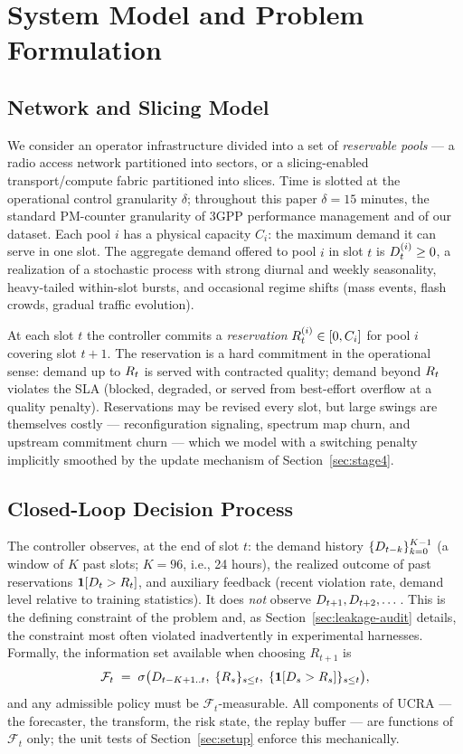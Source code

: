 \section{System Model and Problem Formulation}
\label{sec:system}

\subsection{Network and Slicing Model}

We consider an operator infrastructure divided into a set of
\emph{reservable pools} --- a radio access network partitioned into
sectors, or a slicing-enabled transport/compute fabric partitioned
into slices. Time is slotted at the operational control granularity
$\delta$; throughout this paper $\delta = 15$ minutes, the standard
PM-counter granularity of 3GPP performance management and of our
dataset. Each pool $i$ has a physical capacity $C_i$: the maximum
demand it can serve in one slot. The aggregate demand offered to pool
$i$ in slot $t$ is $D_t^{(i)} \ge 0$, a realization of a stochastic
process with strong diurnal and weekly seasonality, heavy-tailed
within-slot bursts, and occasional regime shifts
(mass events, flash crowds, gradual traffic evolution).

At each slot $t$ the controller commits a \emph{reservation}
$R_t^{(i)} \in [0, C_i]$ for pool $i$ covering slot $t+1$. The
reservation is a hard commitment in the operational sense: demand up
to $R_t$ is served with contracted quality; demand beyond $R_t$
violates the SLA (blocked, degraded, or served from best-effort
overflow at a quality penalty). Reservations may be revised every
slot, but large swings are themselves costly --- reconfiguration
signaling, spectrum map churn, and upstream commitment churn --- which
we model with a switching penalty implicitly smoothed by the update
mechanism of Section~\ref{sec:stage4}.

\subsection{Closed-Loop Decision Process}

The controller observes, at the end of slot $t$: the demand history
$\{D_{t-k}\}_{k=0}^{K-1}$ (a window of $K$ past slots; $K=96$, i.e.,
24 hours), the realized outcome of past reservations
$\mathbf{1}[D_{t} > R_{t}]$, and auxiliary feedback (recent
violation rate, demand level relative to training statistics). It
does \emph{not} observe $D_{t+1}, D_{t+2}, \dots$. This is the
defining constraint of the problem and, as
Section~\ref{sec:leakage-audit} details, the constraint most often
violated inadvertently in experimental harnesses. Formally, the
information set available when choosing $R_{t+1}$ is
\begin{equation}
\mathcal{F}_t \;=\; \sigma\bigl(D_{t-K+1..t},\;
\{R_{s}\}_{s\le t},\; \{\mathbf{1}[D_s > R_s]\}_{s \le t}\bigr),
\label{eq:filtration}
\end{equation}
and any admissible policy must be $\mathcal{F}_t$-measurable. All
components of UCRA --- the forecaster, the transform, the risk state,
the replay buffer --- are functions of $\mathcal{F}_t$ only; the unit
tests of Section~\ref{sec:setup} enforce this mechanically.

